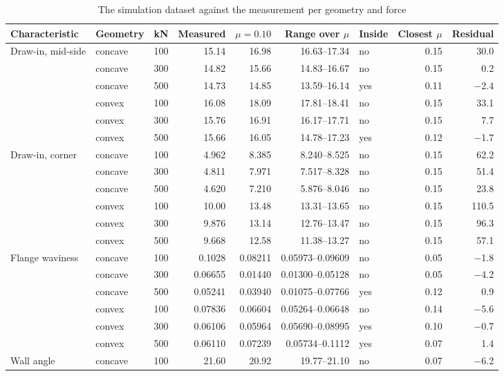 \documentclass[pdflatex,sn-basic]{sn-jnl}
\newcommand{\tabsizesmall}{\footnotesize}
\begin{document}
\begin{table}[p]
\tabsizesmall
\setlength{\tabcolsep}{1.8pt}
\caption{The simulation dataset against the measurement per geometry and force}\label{tab:s-validation}
\begin{tabular}{@{}llrrrrlrr@{}}
\toprule
Characteristic & Geometry & kN & Measured & $\mu=0.10$ & Range over $\mu$ & Inside & Closest $\mu$ & Residual \\
\midrule
Draw-in, mid-side & concave & 100 & 15.14 & 16.98 & 16.63--17.34 & no & 0.15 & 30.0 \\
 & concave & 300 & 14.82 & 15.66 & 14.83--16.67 & no & 0.15 & 0.2 \\
 & concave & 500 & 14.73 & 14.85 & 13.59--16.14 & yes & 0.11 & $-$2.4 \\
 & convex & 100 & 16.08 & 18.09 & 17.81--18.41 & no & 0.15 & 33.1 \\
 & convex & 300 & 15.76 & 16.91 & 16.17--17.71 & no & 0.15 & 7.7 \\
 & convex & 500 & 15.66 & 16.05 & 14.78--17.23 & yes & 0.12 & $-$1.7 \\
Draw-in, corner & concave & 100 & 4.962 & 8.385 & 8.240--8.525 & no & 0.15 & 62.2 \\
 & concave & 300 & 4.811 & 7.971 & 7.517--8.328 & no & 0.15 & 51.4 \\
 & concave & 500 & 4.620 & 7.210 & 5.876--8.046 & no & 0.15 & 23.8 \\
 & convex & 100 & 10.00 & 13.48 & 13.31--13.65 & no & 0.15 & 110.5 \\
 & convex & 300 & 9.876 & 13.14 & 12.76--13.47 & no & 0.15 & 96.3 \\
 & convex & 500 & 9.668 & 12.58 & 11.38--13.27 & no & 0.15 & 57.1 \\
Flange waviness & concave & 100 & 0.1028 & 0.08211 & 0.05973--0.09609 & no & 0.05 & $-$1.8 \\
 & concave & 300 & 0.06655 & 0.01440 & 0.01300--0.05128 & no & 0.05 & $-$4.2 \\
 & concave & 500 & 0.05241 & 0.03940 & 0.01075--0.07766 & yes & 0.12 & 0.9 \\
 & convex & 100 & 0.07836 & 0.06604 & 0.05264--0.06648 & no & 0.14 & $-$5.6 \\
 & convex & 300 & 0.06106 & 0.05964 & 0.05690--0.08995 & yes & 0.10 & $-$0.7 \\
 & convex & 500 & 0.06110 & 0.07239 & 0.05734--0.1112 & yes & 0.07 & 1.4 \\
Wall angle & concave & 100 & 21.60 & 20.92 & 19.77--21.10 & no & 0.07 & $-$6.2 \\

\end{tabular}
\end{table}
\end{document}
